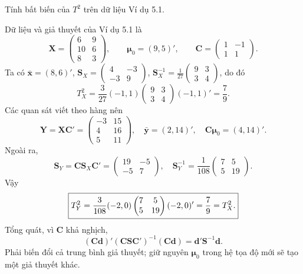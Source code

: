 \begin{problem}[Bài 5.2.]
Tính bất biến của $T^2$ trên dữ liệu Ví dụ 5.1.
\end{problem}
\begin{solution}
Dữ liệu và giả thuyết của Ví dụ 5.1 là
\[
\mathbf X=\begin{pmatrix}6&9\\10&6\\8&3\end{pmatrix},\qquad
\boldsymbol\mu_0=(9,5)',\qquad
\mathbf C=\begin{pmatrix}1&-1\\1&1\end{pmatrix}.
\]
Ta có $\bar{\mathbf x}=(8,6)'$,
$\mathbf S_X=\begin{pmatrix}4&-3\\-3&9\end{pmatrix}$,
$\mathbf S_X^{-1}=\frac1{27}\begin{pmatrix}9&3\\3&4\end{pmatrix}$, do đó
\[
T_X^2=\frac3{27}(-1,1)\begin{pmatrix}9&3\\3&4\end{pmatrix}(-1,1)'
=\frac79.
\]
Các quan sát viết theo hàng nên
\[
\mathbf Y=\mathbf X\mathbf C'=\begin{pmatrix}-3&15\\4&16\\5&11\end{pmatrix},\quad
\bar{\mathbf y}=(2,14)',\quad
\mathbf C\boldsymbol\mu_0=(4,14)'.
\]
Ngoài ra,
\[
\mathbf S_Y=\mathbf C\mathbf S_X\mathbf C'
=\begin{pmatrix}19&-5\\-5&7\end{pmatrix},\quad
\mathbf S_Y^{-1}=\frac1{108}\begin{pmatrix}7&5\\5&19\end{pmatrix}.
\]
Vậy
\[
\boxed{T_Y^2=\frac3{108}(-2,0)\begin{pmatrix}7&5\\5&19\end{pmatrix}(-2,0)'
=\frac79=T_X^2.}
\]
Tổng quát, vì $\mathbf C$ khả nghịch,
\[
(\mathbf C\mathbf d)'(\mathbf C\mathbf S\mathbf C')^{-1}(\mathbf C\mathbf d)
=\mathbf d'\mathbf S^{-1}\mathbf d.
\]
Phải biến đổi cả trung bình giả thuyết; giữ nguyên $\boldsymbol\mu_0$ trong hệ tọa độ mới
sẽ tạo một giả thuyết khác.
\end{solution}

